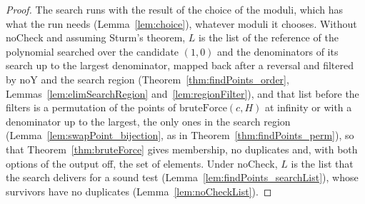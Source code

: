 \begin{proof}
  \leanok
  The search runs with the result of the choice of the moduli, which has what the run needs
  (Lemma~\ref{lem:choice}), whatever moduli it chooses. Without $\mathrm{noCheck}$ and assuming
  Sturm's theorem, $L$ is the list of the reference of the polynomial searched over the candidate
  $(1, 0)$ and the denominators of its search up to the largest denominator, mapped back after a
  reversal and filtered by $\mathrm{noY}$ and the search region (Theorem~\ref{thm:findPoints_order},
  Lemmas~\ref{lem:elimSearchRegion} and~\ref{lem:regionFilter}), and that list before the filters is
  a permutation of the points of $\mathrm{bruteForce}(c, H)$ at infinity or with a denominator up to
  the largest, the only ones in the search region (Lemma~\ref{lem:swapPoint_bijection}, as in
  Theorem~\ref{thm:findPoints_perm}), so that Theorem~\ref{thm:bruteForce} gives membership, no
  duplicates and, with both options of the output off, the set of elements. Under
  $\mathrm{noCheck}$, $L$ is the list that the search delivers for a sound test
  (Lemma~\ref{lem:findPoints_searchList}), whose survivors have no duplicates
  (Lemma~\ref{lem:noCheckList}).
\end{proof}

